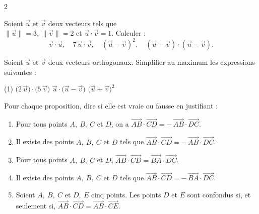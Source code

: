 \documentclass[a4paper,12pt]{article}
\begin{document}
\begin{multicols}{2}
  \begin{exercice}[title=Exercice 8 $\star\star$ { [Calculer] }]{}{}
    Soient \(\vec{u}\) et \(\vec{v}\) deux vecteurs tels que \\
    \(\|\vec{u}\| = 3\), \(\|\vec{v}\| = 2\) et \(\vec{u}\cdot\vec{v} = 1\).
    Calculer :
    \[
      \vec{v}\cdot\vec{u},
      \quad 7\,\vec{u}\cdot\vec{v},
      \quad (\vec{u} - \vec{v})^2,
      \quad (\vec{u} + \vec{v})\cdot(\vec{u} - \vec{v}).
    \]
  \end{exercice}

  \begin{exercice}[title=Exercice 9 $\star\star$ { [Calculer] }]{}{}
    Soient \(\vec{u}\) et \(\vec{v}\) deux vecteurs orthogonaux. Simplifier au maximum les expressions suivantes :
    \begin{tasks}[style=itemize](1)
      \task \(\bigl(2\,\vec{u}\bigr)\cdot\bigl(5\,\vec{v}\bigr)\)
      \task \(\vec{u}\cdot\bigl(\vec{u} - \vec{v}\bigr)\)
      \task \(\bigl(\vec{u} + \vec{v}\bigr)^2\)
    \end{tasks}
  \end{exercice}

  \begin{exercice}[title=Exercice 10 $\star\star$ { [Raisonner] }]{}{}
    Pour chaque proposition, dire si elle est vraie ou fausse en justifiant :
    \begin{enumerate}
      \item Pour tous points \(A,\ B,\ C\) et \(D\), on a \(\overrightarrow{AB}\cdot\overrightarrow{CD} = -\,\overrightarrow{AB}\cdot\overrightarrow{DC}\).
      \item Il existe des points \(A,\ B,\ C\) et \(D\) tels que \(\overrightarrow{AB}\cdot\overrightarrow{CD} = -\,\overrightarrow{AB}\cdot\overrightarrow{DC}\).
      \item Pour tous points \(A,\ B,\ C\) et \(D\), \(\overrightarrow{AB}\cdot\overrightarrow{CD} = \overrightarrow{BA}\cdot\overrightarrow{DC}\).
      \item Il existe des points \(A,\ B,\ C\) et \(D\) tels que \(\overrightarrow{AB}\cdot\overrightarrow{CD} = -\,\overrightarrow{BA}\cdot\overrightarrow{DC}\).
      \item Soient \(A,\ B,\ C\) et \(D,\ E\) cinq points. Les points \(D\) et \(E\) sont confondus si, et seulement si, \(\overrightarrow{AB}\cdot\overrightarrow{CD} = \overrightarrow{AB}\cdot\overrightarrow{CE}\).
    \end{enumerate}
  \end{exercice}


\end{multicols}
\end{document}
